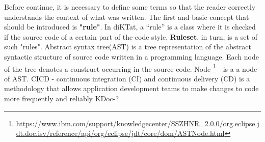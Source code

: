 Before continue, it is necessary to define some terms so that the reader correctly understands the context of what was written. The first and basic concept that should be introduced is \textbf{"rule"}. In diKTat, a “rule” is a class where it is checked if the source code of a certain part of the code style. \textbf{Ruleset}, in turn, is a set of such "rules". Abstract syntax tree(AST) is a tree representation of the abstract syntactic structure of source code written in a programming language. Each node of the tree denotes a construct occurring in the source code. Node \footnote{\url{ https://www.ibm.com/support/knowledgecenter/SSZHNR_2.0.0/org.eclipse.jdt.doc.isv/reference/api/org/eclipse/jdt/core/dom/ASTNode.html}} - is a a node of AST. CICD - continuous integration (CI) and continuous delivery (CD) is a methodology that allows application development teams to make changes to code more frequently and reliably KDoc-?